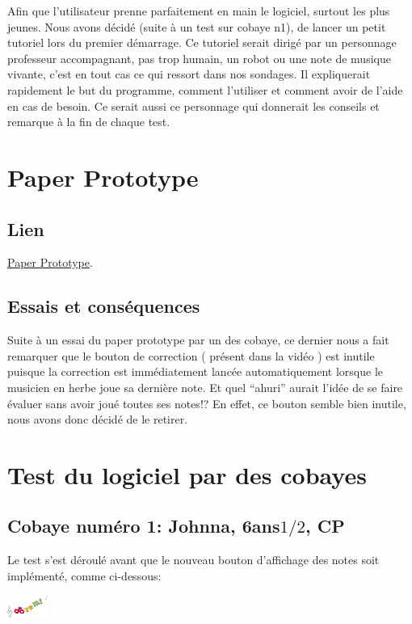 \documentclass{article}
\begin{document}
Afin que l'utilisateur prenne parfaitement en main le logiciel, surtout les plus jeunes. Nous avons décidé (suite à un test sur cobaye n1),
de lancer un petit tutoriel lors du premier démarrage. Ce tutoriel serait dirigé par un personnage professeur accompagnant,
pas trop humain, un robot ou une note de musique vivante, c'est en tout cas ce qui ressort dans nos sondages.
Il expliquerait rapidement le but du programme, comment l'utiliser et comment avoir de l'aide en cas de besoin.
Ce serait aussi ce personnage qui donnerait les conseils et remarque à la fin de chaque test.





\section{Paper Prototype}
\subsection{Lien}
\href{https://www.youtube.com/watch?v=gwFMDVW2Swo}{Paper Prototype}.
\subsection{Essais et conséquences}
Suite à un essai du paper prototype par un des cobaye, ce dernier nous a fait remarquer que le bouton de correction ( présent dans la vidéo )
est inutile puisque la correction est immédiatement lancée automatiquement lorsque le musicien en herbe joue sa dernière note. Et 
quel ``ahuri'' aurait l'idée de se faire évaluer sans avoir joué toutes ses notes!?
En effet, ce bouton semble bien inutile, nous avons donc décidé de le retirer.
\section{Test du logiciel par des cobayes}
\subsection{Cobaye numéro 1: Johnna, 6ans$1/2$, CP}
Le test s'est déroulé avant que le nouveau bouton d'affichage des notes soit
implémenté, comme ci-dessous:
\begin{center}
\includegraphics[width = 50px]{./images/doremi.png}
\end{center}
\end{document}
